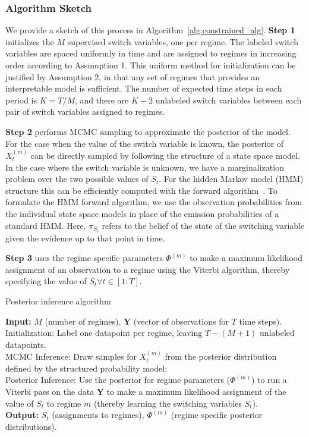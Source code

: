 \subsubsection{Algorithm Sketch}
We provide a sketch of this process in Algorithm~\ref{alg:constrained_alg}. \textbf{Step 1} initializes the $M$ supervised switch variables, one per regime. The labeled switch variables are spaced uniformly in time and are assigned to regimes in increasing order according to Assumption 1. This uniform method for initialization can be justified  by Assumption 2, in that  any set of regimes  that provides an interpretable model is sufficient. The number of expected  time steps in each period is $K=T/M$, and there are  $K-2$ unlabeled switch variables between each pair of  switch variables assigned to regimes.

\textbf{Step 2} performs MCMC sampling to approximate the posterior of the model. For the case when the value of the switch variable is known, the posterior of $X^{(m)}_t$ can be directly sampled by following the structure of a state space model. In the case where the switch variable is unknown, we have a marginalization problem over the two possible values of $S_t$. For the hidden Markov model (HMM) structure this can be efficiently computed with the forward algorithm~\citep{shumway2000time}. To formulate the HMM forward algorithm, we use the observation probabilities from the individual state space models in place of the emission probabilities of a standard HMM. Here, $\pi_{S_i}$ refers to the belief of the state of the switching variable given the evidence up to that point in time.

\textbf{Step 3} uses the regime specific parameters $\Phi^{(m)}$ to make a maximum likelihood assignment of an observation to a regime using the Viterbi algorithm, thereby specifying the value of $S_t \forall t \in [1:T]$.

\LinesNotNumbered
\begin{algorithm}
\caption{Posterior inference algorithm}\label{alg:constrained_alg}
\textbf{Input: } $M$ (number of regimes), $\mathbf{Y}$ (vector of observations for $T$ time steps).\\
\nextnr
Initialization: Label one datapoint per regime, leaving $T - (M+1)$ unlabeled datapoints.\\
\nextnr
MCMC Inference: Draw samples for $X_{t}^{(m)}$ from the posterior distribution defined by the structured probability model:\\
\nextnr
Posterior Inference: Use the posterior for regime parameters ($\Phi^{(m)}$) to run a Viterbi pass on the data $\mathbf{Y}$ to make a maximum likelihood assignment of the value of $S_t$ to regime $m$ (thereby learning the switching variables $S_t$).\\
\textbf{Output: } $S_t$ (assignments to regimes), $\Phi^{(m)}$ (regime specific posterior distributions).
\end{algorithm}

